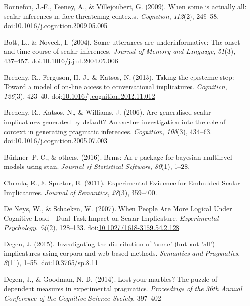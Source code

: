 \documentclass[floatsintext,man]{apa6}
\theoremstyle{definition}
\theoremstyle{definition}
\theoremstyle{definition}
\theoremstyle{remark}
\begin{document}
\hypertarget{ref-Bonnefon2009}{}
Bonnefon, J.-F., Feeney, A., \& Villejoubert, G. (2009). When some is
actually all: scalar inferences in face-threatening contexts.
\emph{Cognition}, \emph{112}(2), 249--58.
doi:\href{https://doi.org/10.1016/j.cognition.2009.05.005}{10.1016/j.cognition.2009.05.005}

\hypertarget{ref-Bott2004}{}
Bott, L., \& Noveck, I. (2004). Some utterances are underinformative:
The onset and time course of scalar inferences. \emph{Journal of Memory
and Language}, \emph{51}(3), 437--457.
doi:\href{https://doi.org/10.1016/j.jml.2004.05.006}{10.1016/j.jml.2004.05.006}

\hypertarget{ref-Breheny2013}{}
Breheny, R., Ferguson, H. J., \& Katsos, N. (2013). Taking the epistemic
step: Toward a model of on-line access to conversational implicatures.
\emph{Cognition}, \emph{126}(3), 423--40.
doi:\href{https://doi.org/10.1016/j.cognition.2012.11.012}{10.1016/j.cognition.2012.11.012}

\hypertarget{ref-Breheny2006}{}
Breheny, R., Katsos, N., \& Williams, J. (2006). Are generalised scalar
implicatures generated by default? An on-line investigation into the
role of context in generating pragmatic inferences. \emph{Cognition},
\emph{100}(3), 434--63.
doi:\href{https://doi.org/10.1016/j.cognition.2005.07.003}{10.1016/j.cognition.2005.07.003}

\hypertarget{ref-burkner2016brms}{}
Bürkner, P.-C., \& others. (2016). Brms: An r package for bayesian
multilevel models using stan. \emph{Journal of Statistical Software},
\emph{80}(1), 1--28.

\hypertarget{ref-Chemla2011}{}
Chemla, E., \& Spector, B. (2011). Experimental Evidence for Embedded
Scalar Implicatures. \emph{Journal of Semantics}, \emph{28}(3),
359--400.

\hypertarget{ref-DeNeys2007}{}
De Neys, W., \& Schaeken, W. (2007). When People Are More Logical Under
Cognitive Load - Dual Task Impact on Scalar Implicature.
\emph{Experimental Psychology}, \emph{54}(2), 128--133.
doi:\href{https://doi.org/10.1027/1618-3169.54.2.128}{10.1027/1618-3169.54.2.128}

\hypertarget{ref-Degen2015}{}
Degen, J. (2015). Investigating the distribution of 'some' (but not
'all') implicatures using corpora and web-based methods. \emph{Semantics
and Pragmatics}, \emph{8}(11), 1--55.
doi:\href{https://doi.org/10.3765/sp.8.11}{10.3765/sp.8.11}

\hypertarget{ref-Degen2014}{}
Degen, J., \& Goodman, N. D. (2014). Lost your marbles? The puzzle of
dependent measures in experimental pragmatics. \emph{Proceedings of the
36th Annual Conference of the Cognitive Science Society}, 397--402.
\end{document}
